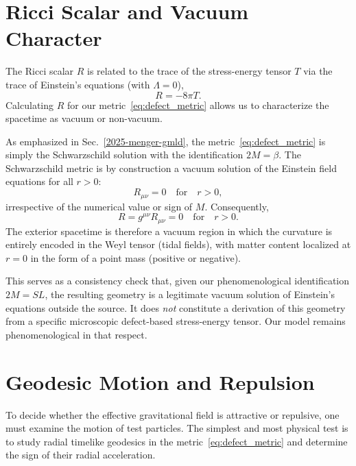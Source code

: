 \documentclass[%
  reprint,
  superscriptaddress,
  showpacs,
  showkeys,
  amsmath,amssymb,
  pra,
  longbibliography,
  floatfix,
  x11names
]{revtex4-2}
\begin{document}
\section{Ricci Scalar and Vacuum Character}
\label{sec:ricci}

The Ricci scalar \(R\) is related to the trace of the stress-energy tensor \(T\) via the trace of Einstein's equations (with \(\Lambda=0\)),
\begin{equation}
R = -8\pi T.
\end{equation}
Calculating \(R\) for our metric~\eqref{eq:defect_metric} allows us to characterize the spacetime as vacuum or non-vacuum.

As emphasized in Sec.~\ref{2025-menger-gmld}, the metric~\eqref{eq:defect_metric} is simply the Schwarzschild solution with the identification \(2M=\beta\). The Schwarzschild metric is by construction a vacuum solution of the Einstein field equations for all \(r>0\):
\begin{equation}
R_{\mu\nu} = 0 \quad \text{for} \quad r>0,
\end{equation}
irrespective of the numerical value or sign of \(M\). Consequently,
\begin{equation}
R = g^{\mu\nu} R_{\mu\nu} = 0 \quad \text{for} \quad r>0.
\end{equation}
The exterior spacetime is therefore a vacuum region in which the curvature is entirely encoded in the Weyl tensor (tidal fields), with matter content localized at \(r=0\) in the form of a point mass (positive or negative).

This serves as a consistency check that, given our phenomenological identification \(2M = SL\), the resulting geometry is a legitimate vacuum solution of Einstein's equations outside the source. It does \emph{not} constitute a derivation of this geometry from a specific microscopic defect-based stress-energy tensor. Our model remains phenomenological in that respect.

\section{Geodesic Motion and Repulsion}
\label{sec:geodesic}

To decide whether the effective gravitational field is attractive or repulsive, one must examine the motion of test particles. The simplest and most physical test is to study radial timelike geodesics in the metric~\eqref{eq:defect_metric} and determine the sign of their radial acceleration.
\end{document}

